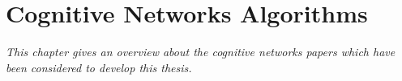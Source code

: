 \chapter{Cognitive Networks Algorithms}
\label{sec:cognets}

\textit{This chapter gives an overview about the cognitive networks papers which have been considered to develop this thesis.}





%
%
% 

